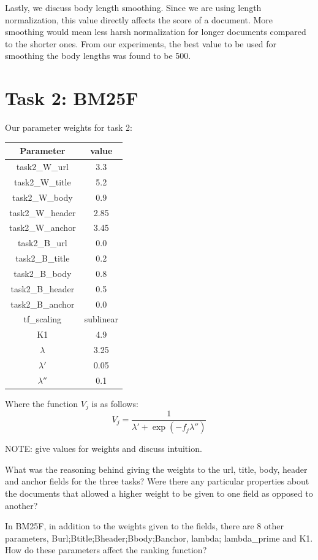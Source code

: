 \documentclass[10pt,twocolumn]{article}
\begin{document}
Lastly, we discuss body length smoothing. Since we are using length normalization, this value directly affects the score of a document. More smoothing would mean less harsh normalization for longer documents compared to the shorter ones. From our experiments, the best value to be used for smoothing the body lengths was found to be 500.

\section*{Task 2: BM25F}
Our parameter weights for task 2:
\begin{table}[H]
\centering
\begin{tabular}{|c|c|}
\hline
Parameter & value \\\hline
task2\_W\_url & 3.3\\\hline
task2\_W\_title & 5.2\\\hline
task2\_W\_body & 0.9\\\hline
task2\_W\_header & 2.85\\\hline
task2\_W\_anchor & 3.45\\\hline
task2\_B\_url & 0.0\\\hline
task2\_B\_title & 0.2\\\hline
task2\_B\_body & 0.8\\\hline
task2\_B\_header & 0.5\\\hline
task2\_B\_anchor & 0.0\\\hline
tf\_scaling & sublinear\\\hline
K1 & 4.9\\\hline
$\lambda$ & 3.25\\\hline
$\lambda'$ & 0.05\\\hline
$\lambda''$ & 0.1\\\hline
\end{tabular}
\end{table}
Where the function $V_j$ is as follows:
\begin{equation*}
V_j = \frac{1}{\lambda'+\exp({-f_j\lambda''})}
\end{equation*}

NOTE: give values for weights and discuss intuition.

What was the reasoning behind giving the weights to the url, title,
body, header and anchor fields for the three tasks? Were there any
particular properties about the documents that allowed a higher weight
to be given to one field as opposed to another?

In BM25F, in addition to the weights given to the fields, there are
8 other parameters, Burl;Btitle;Bheader;Bbody;Banchor, lambda; lambda\_prime and K1.
How do these parameters affect the ranking function?
\end{document}
